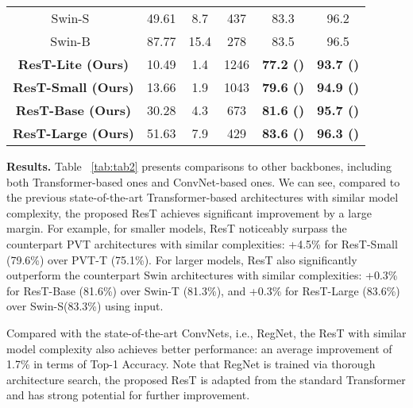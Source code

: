 \documentclass{article}
\begin{document}
\begin{table*}[htb]
{\begin{center}
\begin{tabular}{c|c|c|c|c|c}
			Swin-S~\cite{DBLP:journals/corr/abs-2103-14030} & 49.61 & 8.7 & 437 & 83.3 & 96.2 \\ 
			Swin-B~\cite{DBLP:journals/corr/abs-2103-14030} & 87.77 & 15.4 & 278 & 83.5 & 96.5 \\ 
			\midrule
			\textbf{ResT-Lite (Ours)} & 10.49 & 1.4 & 1246 & \textbf{77.2 (\textcolor[rgb]{ 0,  0,  1}{})} & \textbf{93.7 (\textcolor[rgb]{ 0,  0,  1}{})} \\ 
			\textbf{ResT-Small (Ours)} & 13.66 & 1.9 & 1043 & \textbf{79.6 (\textcolor[rgb]{ 0,  0,  1}{})} & \textbf{94.9 (\textcolor[rgb]{ 0,  0,  1}{})} \\ 
			\textbf{ResT-Base (Ours)} & 30.28 & 4.3 & 673 & \textbf{81.6 (\textcolor[rgb]{ 0,  0,  1}{})} & \textbf{95.7 (\textcolor[rgb]{ 0,  0,  1}{})} \\ 
			\textbf{ResT-Large (Ours)} & 51.63 & 7.9 & 429 & \textbf{83.6 (\textcolor[rgb]{ 0,  0,  1}{})} & \textbf{96.3 (\textcolor[rgb]{ 0,  0,  1}{})} \\ 
			\bottomrule[1.2pt]
		\end{tabular}
	\end{center}
		}
\end{table*}

\textbf{Results.} Table ~\ref{tab:tab2} presents comparisons to other backbones, including both Transformer-based ones and ConvNet-based ones. We can see, compared to the previous state-of-the-art Transformer-based architectures with similar model complexity, the proposed ResT achieves significant improvement by a large margin. For example, for smaller models, ResT noticeably surpass the counterpart PVT architectures with similar complexities: +4.5\% for ResT-Small (79.6\%) over PVT-T (75.1\%). For larger models, ResT also significantly outperform the counterpart Swin architectures with similar complexities: +0.3\% for ResT-Base (81.6\%) over Swin-T (81.3\%), and +0.3\% for ResT-Large (83.6\%) over Swin-S(83.3\%) using  input.

Compared with the state-of-the-art ConvNets, i.e., RegNet, the ResT with similar model complexity also achieves better performance: an average improvement of 1.7\% in terms of Top-1 Accuracy. Note that RegNet is trained via thorough architecture search, the proposed ResT is adapted from the standard Transformer and has strong potential for further improvement.
\end{document}
